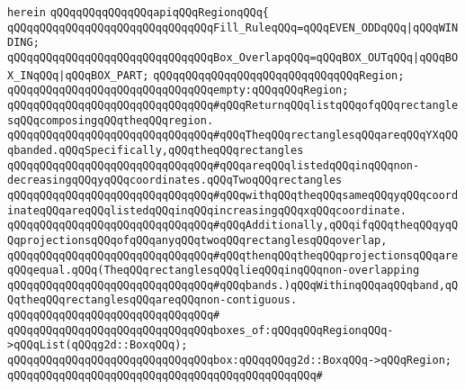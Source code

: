 \verb|herein|\newline
\newline
\verb|qQQqqQQqqQQqqQQqapiqQQqRegionqQQq{|\newline
\newline
\verb|qQQqqQQqqQQqqQQqqQQqqQQqqQQqqQQqFill_RuleqQQq=qQQqEVEN_ODDqQQq|\verb#|qQQqWINDING;#\newline
\newline
\verb|qQQqqQQqqQQqqQQqqQQqqQQqqQQqqQQqBox_OverlapqQQq=qQQqBOX_OUTqQQq|\verb#|qQQqBOX_INqQQq|qQQqBOX_PART;#\newline
\newline
\verb|qQQqqQQqqQQqqQQqqQQqqQQqqQQqqQQqRegion;|\newline
\newline
\verb|qQQqqQQqqQQqqQQqqQQqqQQqqQQqqQQqempty:qQQqqQQqRegion;|\newline
\newline
\verb|qQQqqQQqqQQqqQQqqQQqqQQqqQQqqQQq#qQQqReturnqQQqlistqQQqofqQQqrectanglesqQQqcomposingqQQqtheqQQqregion.|\newline
\verb|qQQqqQQqqQQqqQQqqQQqqQQqqQQqqQQq#qQQqTheqQQqrectanglesqQQqareqQQqYXqQQqbanded.qQQqSpecifically,qQQqtheqQQqrectangles|\newline
\verb|qQQqqQQqqQQqqQQqqQQqqQQqqQQqqQQq#qQQqareqQQqlistedqQQqinqQQqnon-decreasingqQQqyqQQqcoordinates.qQQqTwoqQQqrectangles|\newline
\verb|qQQqqQQqqQQqqQQqqQQqqQQqqQQqqQQq#qQQqwithqQQqtheqQQqsameqQQqyqQQqcoordinateqQQqareqQQqlistedqQQqinqQQqincreasingqQQqxqQQqcoordinate.|\newline
\verb|qQQqqQQqqQQqqQQqqQQqqQQqqQQqqQQq#qQQqAdditionally,qQQqifqQQqtheqQQqyqQQqprojectionsqQQqofqQQqanyqQQqtwoqQQqrectanglesqQQqoverlap,|\newline
\verb|qQQqqQQqqQQqqQQqqQQqqQQqqQQqqQQq#qQQqthenqQQqtheqQQqprojectionsqQQqareqQQqequal.qQQq(TheqQQqrectanglesqQQqlieqQQqinqQQqnon-overlapping|\newline
\verb|qQQqqQQqqQQqqQQqqQQqqQQqqQQqqQQq#qQQqbands.)qQQqWithinqQQqaqQQqband,qQQqtheqQQqrectanglesqQQqareqQQqnon-contiguous.|\newline
\verb|qQQqqQQqqQQqqQQqqQQqqQQqqQQqqQQq#|\newline
\verb|qQQqqQQqqQQqqQQqqQQqqQQqqQQqqQQqboxes_of:qQQqqQQqRegionqQQq->qQQqList(qQQqg2d::BoxqQQq);|\newline
\newline
\verb|qQQqqQQqqQQqqQQqqQQqqQQqqQQqqQQqbox:qQQqqQQqg2d::BoxqQQq->qQQqRegion;|\newline
\verb|qQQqqQQqqQQqqQQqqQQqqQQqqQQqqQQqqQQqqQQqqQQqqQQq#|\newline

